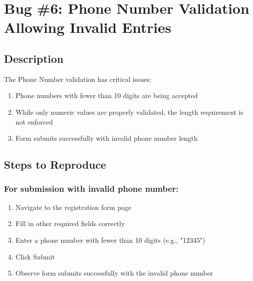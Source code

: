 \section{Bug \#6: Phone Number Validation Allowing Invalid Entries}
\subsection*{Description}
The Phone Number validation has critical issues:
\begin{enumerate}
    \item Phone numbers with fewer than 10 digits are being accepted
    \item While only numeric values are properly validated, the length requirement is not enforced
    \item Form submits successfully with invalid phone number length
\end{enumerate}
\subsection*{Steps to Reproduce}
\subsubsection*{For submission with invalid phone number:}
\begin{enumerate}
    \item Navigate to the registration form page
    \item Fill in other required fields correctly
    \item Enter a phone number with fewer than 10 digits (e.g., "12345")
    \item Click Submit
    \item Observe form submits successfully with the invalid phone number
\end{enumerate}
